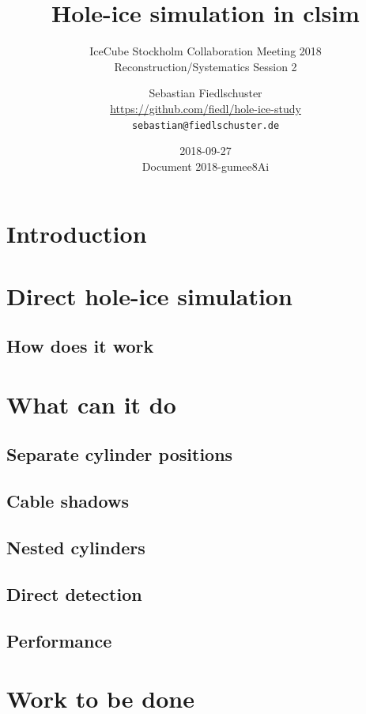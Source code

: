 \documentclass[green, 12pt]{beamer}
\title{Hole-ice simulation in clsim}
\subtitle{IceCube Stockholm Collaboration Meeting 2018 \\ Reconstruction/Systematics Session 2}
\date{2018-09-27 \\ \vspace*{2mm} \tiny{Document 2018-gumee8Ai}}
\author[Sebastian Fiedlschuster, ECAP Erlangen]{Sebastian Fiedlschuster \\ \tiny{\url{https://github.com/fiedl/hole-ice-study}} \\ \tiny\texttt{sebastian@fiedlschuster.de}}
\institute{Erlangen Centre for Astroparticle Physics}
\newif\ifplacelogo %
\begin{document}



\placelogofalse

\section{Introduction}
  


  \section{Direct hole-ice simulation}
  \subsection{How does it work}
    

  \section{What can it do}
  \subsection{Separate cylinder positions}
    
  \subsection{Cable shadows}
    
  \subsection{Nested cylinders}
    
    
  \subsection{Direct detection}
    

  \subsection{Performance}
    

  \section{Work to be done}
    
\end{document}
